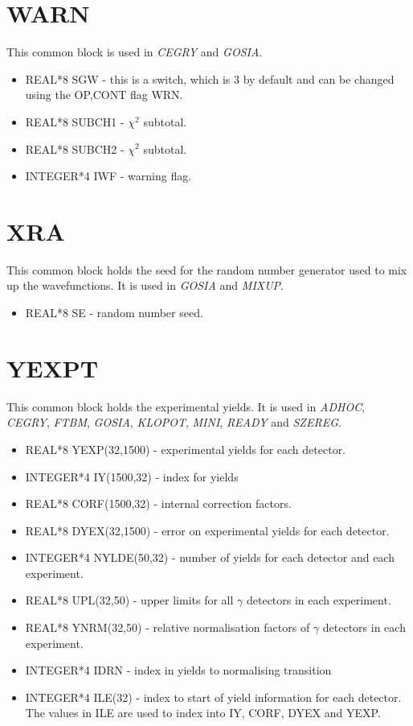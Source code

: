 \section{WARN}

This common block is used in {\em CEGRY} and {\em GOSIA}.

\begin{itemize}
\item REAL*8 SGW - this is a switch, which is 3 by default and can be
changed using the OP,CONT flag WRN.
\item REAL*8 SUBCH1 - $\chi^2$ subtotal.
\item REAL*8 SUBCH2 - $\chi^2$ subtotal.
\item INTEGER*4 IWF - warning flag.
\end{itemize}

\section{XRA}

This common block holds the seed for the random number generator used to mix
up the wavefunctions. It is used in {\em GOSIA} and {\em MIXUP}.

\begin{itemize}
\item REAL*8 SE - random number seed.
\end{itemize}

\section{YEXPT}

This common block holds the experimental yields. It is used in {\em ADHOC},
{\em CEGRY}, {\em FTBM}, {\em GOSIA}, {\em KLOPOT}, {\em MINI}, {\em READY}
and {\em SZEREG}.

\begin{itemize}
\item REAL*8 YEXP(32,1500) - experimental yields for each detector.
\item INTEGER*4 IY(1500,32) - index for yields
\item REAL*8 CORF(1500,32) - internal correction factors.
\item REAL*8 DYEX(32,1500) - error on experimental yields for each detector.
\item INTEGER*4 NYLDE(50,32) - number of yields for each detector and each
experiment.
\item REAL*8 UPL(32,50) - upper limits for all $\gamma$ detectors in each
experiment.
\item REAL*8 YNRM(32,50) - relative normalisation factors of $\gamma$
detectors in each experiment.
\item INTEGER*4 IDRN - index in yields to normalising transition
\item INTEGER*4 ILE(32) - index to start of yield information for each
detector. The values in ILE are used to index into IY, CORF, DYEX and YEXP.
\end{itemize}

